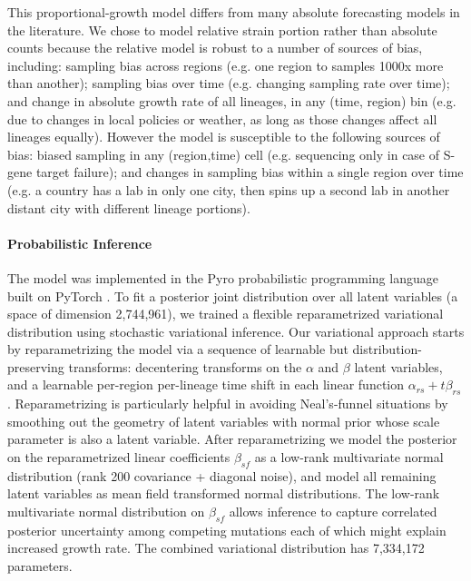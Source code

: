 \documentclass[12pt]{article}
\begin{document}
This proportional-growth model differs from many absolute forecasting models in the literature.
We chose to model relative strain portion rather than absolute counts because the relative model is robust to a number of sources of bias, including:
sampling bias across regions (e.g. one region to samples 1000x more than another);
sampling bias over time (e.g. changing sampling rate over time); and
change in absolute growth rate of all lineages, in any (time, region) bin (e.g. due to changes in local policies or weather, as long as those changes affect all lineages equally).
However the model is susceptible to the following sources of bias:
biased sampling in any (region,time) cell (e.g. sequencing only in case of S-gene target failure); and changes in sampling bias within a single region over time (e.g. a country has a lab in only one city, then spins up a second lab in another distant city with different lineage portions).

\paragraph*{Probabilistic Inference}

The model was implemented in the Pyro probabilistic programming language \cite{bingham2019pyro} built on PyTorch \cite{paszke2017automatic}.
To fit a posterior joint distribution over all latent variables (a space of dimension 2,744,961), we trained a flexible reparametrized variational distribution using stochastic variational inference.
Our variational approach starts by reparametrizing the model via a sequence of learnable but distribution-preserving transforms: decentering transforms \cite{gorinova2020automatic} on the $\alpha$ and $\beta$ latent variables, and a learnable per-region per-lineage time shift in each linear function $\alpha_{rs}+t\beta_{rs}$.
Reparametrizing is particularly helpful in avoiding Neal's-funnel situations \cite{neal2003slice} by smoothing out the geometry of latent variables with normal prior whose scale parameter is also a latent variable.
After reparametrizing we model the posterior on the reparametrized linear coefficients $\beta_{sf}$ as a low-rank multivariate normal distribution (rank 200 covariance + diagonal noise), and model all remaining latent variables as mean field transformed normal distributions.
The low-rank multivariate normal distribution on $\beta_{sf}$ allows inference to capture correlated posterior uncertainty among competing mutations each of which might explain increased growth rate.
The combined variational distribution has 7,334,172 parameters.
\end{document}
